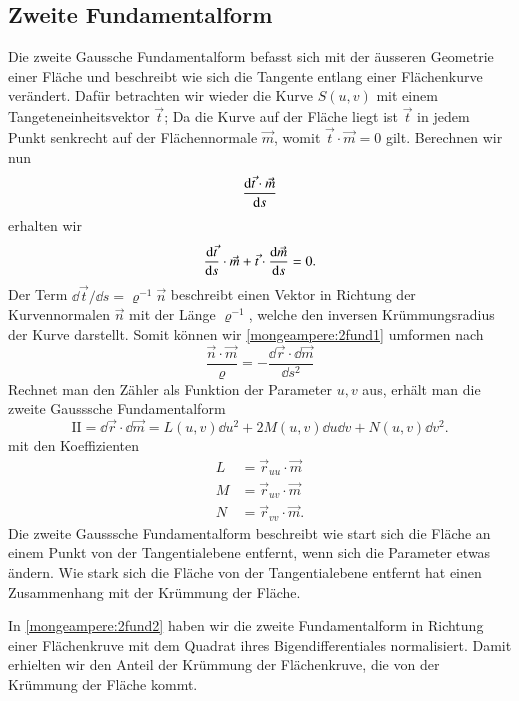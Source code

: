 \subsection{Zweite Fundamentalform}
Die zweite Gaussche Fundamentalform befasst sich mit der äusseren Geometrie einer 
Fläche und beschreibt wie sich die Tangente entlang einer Flächenkurve verändert.
Dafür betrachten wir wieder die Kurve $S(u,v)$ mit einem Tangeteneinheitsvektor 
$\vec t$;
Da die Kurve auf der Fläche liegt ist $\vec t$ in jedem Punkt senkrecht auf der 
Flächennormale $\vec m$, womit $\vec t \cdot \vec m = 0$ gilt. 
Berechnen wir nun 
\begin{equation}
  \dv{\vec t \cdot \vec m}{s}
  \label{mongeampere:2fund0}
\end{equation}
erhalten wir 
\begin{equation}
  \dv{\vec t}{s} \cdot \vec m + \vec t \cdot \dv{\vec m}{s} = 0. 
  \label{mongeampere:2fund1}
\end{equation}
Der Term $\dd \vec t / \dd s = \varrho^{-1} \vec n$ beschreibt einen Vektor in Richtung der Kurvennormalen 
$\vec n$ mit der Länge $\varrho^{-1}$, welche den inversen Krümmungsradius der Kurve 
darstellt.
Somit können wir \eqref{mongeampere:2fund1} umformen nach
\begin{equation}
  \frac{\vec n \cdot \vec m}{\varrho} = - \frac{\dd \vec r \cdot \dd \vec m }{\dd s^2} 
  \label{mongeampere:2fund2}
\end{equation}
Rechnet man den Zähler als Funktion der Parameter $u, v$ aus, erhält man die zweite 
Gausssche Fundamentalform
\begin{equation}
  \mathrm{I\!I} = \dd \vec r \cdot \dd \vec m  = L(u, v) \dd u^2 + 2 M (u,v) \dd u \dd v + N(u,v) \dd v^2.
  \label{mongeampere:2fund}
\end{equation}
mit den Koeffizienten
\begin{align*}
  L &= \vec r_{uu} \cdot \vec m \\ 
  M &= \vec r_{uv} \cdot \vec m \\
  N &= \vec r_{vv} \cdot \vec m.
  \label{mongeampere:2fundkoef}
\end{align*}
Die zweite Gausssche Fundamentalform beschreibt wie start sich die Fläche an einem Punkt
von der Tangentialebene entfernt, wenn sich die Parameter etwas ändern.
Wie stark sich die Fläche von der Tangentialebene entfernt hat einen Zusammenhang mit der Krümmung der Fläche.

In \eqref{mongeampere:2fund2} haben wir die zweite Fundamentalform in Richtung einer Flächenkruve mit
dem Quadrat ihres Bigendifferentiales normalisiert.
Damit erhielten wir den Anteil der Krümmung der Flächenkruve, die von der Krümmung der Fläche kommt.

